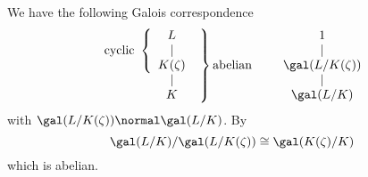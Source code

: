 \documentclass[a4paper]{article}
\begin{document}
\begin{remark}
  We have the following Galois correspondence
  \[
    \left.
    \begin{array}[h]{c}
      \text{cyclic }\left\{
      \begin{array}[h]{c}
        L \\
        | \\
        K(\zeta)
      \end{array}
      \right. \\
      \hspace{37pt} | \\
      \hspace{37pt} K
    \end{array}
  \right\} \text{abelian}
  \qquad
    \begin{array}[h]{c}
      1 \\
      | \\
      \gal(L/K(\zeta)) \\
      | \\
      \gal(L/K)
    \end{array}
  \]
  with \(\gal(L/K(\zeta)) \normal \gal(L/K)\). By 
  \[
    \gal(L/K)/\gal(L/K(\zeta)) \cong \gal(K(\zeta)/K)
  \]
  which is abelian.
\end{remark}
\end{document}
